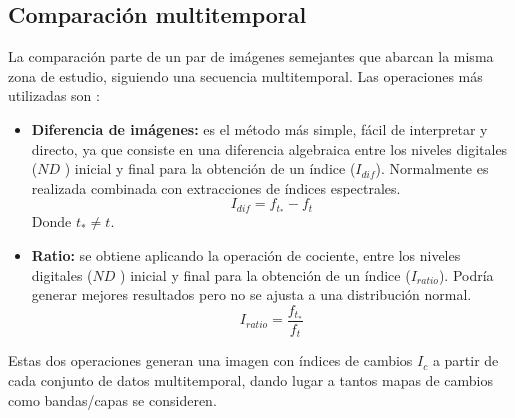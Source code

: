 \subsection{Comparaci\'on multitemporal}\label{subsec:compMult}
La comparaci\'on parte de un par de im\'agenes semejantes que abarcan la misma zona de estudio, siguiendo una secuencia multitemporal. Las operaciones m\'as utilizadas son \cite{chuvieco1998factor}: 
	\begin{itemize}
		\item \textbf{Diferencia de im\'agenes:} es el m\'etodo m\'as simple, f\'acil de interpretar y directo, ya que consiste en una diferencia algebraica entre los niveles digitales ($ ND $ ) inicial y final para la obtenci\'on de un \'indice ($ I_{dif} $). Normalmente es realizada combinada  con extracciones de \'indices espectrales.
								\begin{equation}
								I_{dif} = f_{t_{*}}-f_{t}
								\end{equation} 	
		Donde $ t_{*} \neq t $.
				\item \textbf{Ratio:} se obtiene aplicando la operación de cociente, entre los niveles digitales ($ ND $ ) inicial y final para la obtenci\'on de un \'indice ($ I_{ratio} $). Podr\'ia  generar mejores resultados pero no se ajusta a una distribución normal.
										\begin{equation}
										I_{ratio} = \dfrac{f_{t_{*}}}{f_{t}}
										\end{equation} 	

		\end{itemize}
Estas dos operaciones generan una imagen con \'indices de cambios $ I_{c} $ a partir de cada conjunto de datos multitemporal, dando lugar a tantos mapas de cambios como bandas/capas se consideren.
